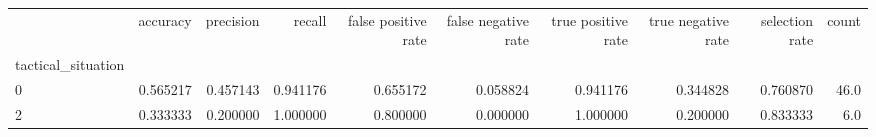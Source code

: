\begin{tabular}{lrrrrrrrrr}
\toprule
{} &  accuracy &  precision &    recall &  false positive rate &  false negative rate &  true positive rate &  true negative rate &  selection rate &  count \\
tactical\_situation &           &            &           &                      &                      &                     &                     &                 &        \\
\midrule
0                  &  0.565217 &   0.457143 &  0.941176 &             0.655172 &             0.058824 &            0.941176 &            0.344828 &        0.760870 &   46.0 \\
2                  &  0.333333 &   0.200000 &  1.000000 &             0.800000 &             0.000000 &            1.000000 &            0.200000 &        0.833333 &    6.0 \\
\bottomrule
\end{tabular}
